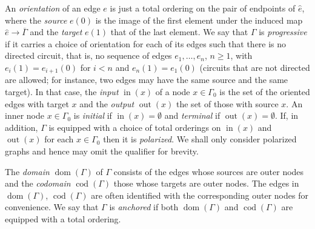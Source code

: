 \documentclass[12pt]{amsart}
\theoremstyle{plain}
\theoremstyle{definition}
\theoremstyle{remark}
\numberwithin{equation}{section}
\theoremstyle{plain}
\DeclareMathOperator{\dom}{dom}
\DeclareMathOperator{\cod}{cod}
\newcommand{\0}{\emptyset}
\newcommand{\fun}{\longrightarrow}
\DeclareMathOperator{\out}{out}
\newcommand{\memph}[1]{{\color{magenta}\emph{#1}}}
\DeclareMathOperator{\inn}{in}
\begin{document}
An \memph{orientation} of an edge $e$ is just a total ordering on the pair of endpoints of $\hat e$, where the \memph{source} $e(0)$ is the image of the first element under the induced map $\hat e \fun  \overline \Gamma$ and the
\memph{target} $e(1)$ that of the last element. We say that $\Gamma$ is \memph{progressive} if it carries a choice of orientation for
each of its edges such that there is no directed circuit, that is, no sequence of edges $e_1, \ldots, e_n$, $n \geq 1$, with $e_i(1) = e_{i+1}(0)$ for $i < n$ and $e_n(1) = e_1(0)$ (circuits that are not directed are allowed; for instance, two edges may have the same source and the same target). In that case, the \memph{input} $\inn(x)$ of a node $x \in \Gamma_0$ is the set of the oriented edges with target $x$ and the \memph{output} $\out(x)$ the set of those with source $x$. An inner node $x \in \Gamma_0$ is \memph{initial} if $\inn(x) = \0$ and \memph{terminal} if $\out(x) = \0$. If, in addition, $\Gamma$ is equipped with a choice of total orderings on $\inn(x)$ and $\out(x)$ for each $x \in \Gamma_0$ then it is  \memph{polarized}. We shall only consider polarized graphs and hence may omit the qualifier for brevity.

The \memph{domain} $\dom(\Gamma)$ of $\Gamma$ consists of the edges whose sources are outer nodes and the \memph{codomain} $\cod(\Gamma)$ those whose targets are outer nodes. The edges in $\dom(\Gamma)$, $\cod(\Gamma)$ are often identified with the corresponding outer nodes for convenience. We say that $\Gamma$ is \memph{anchored} if both $\dom(\Gamma)$ and $\cod (\Gamma)$ are equipped with a total ordering.
\end{document}
